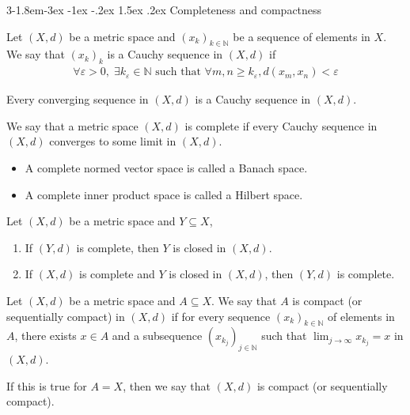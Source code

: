 \documentclass{tufte-handout}
\makeatletter
\renewcommand{\subsection}{\@startsection{subsection}%
    {3}{-1.8em}{-3ex \@plus -1ex \@minus -.2ex}%
    {1.5ex \@plus .2ex}
    {\hspace*{-5.5em}\fcolorbox{ltblue}{ltblue}{\parbox[c][1.0ex][b]{4em}{\phantom{space}}}
    \normalfont\large\itshape\color{ltblue}}}
\makeatother
\begin{document}
\subsection{Completeness and compactness}

\begin{Definition}
    Let \((X, d)\) be a metric space and \( (x_k)_{k\in \mathbb{N}} \) be a sequence of elements in \( X \).
    We say that \((x_k)_k\) is a Cauchy sequence in \( (X, d) \) if
    \begin{align}
        \forall \varepsilon > 0, \; \exists k_\varepsilon \in \mathbb{N} \text{ such that } 
        \forall m, n \geq k_\varepsilon, d(x_m, x_n) < \varepsilon
    \end{align}
\end{Definition}

\begin{Proposition}
    Every converging sequence in \((X, d)\) is a Cauchy sequence in \( (X, d) \).
\end{Proposition}

\begin{Definition}
    We say that a metric space \((X, d)\) is complete if every 
    Cauchy sequence in \( (X, d) \) converges to some limit in \( (X, d) \).
    \begin{itemize}
        \item A complete normed vector space is called a Banach space.
        \item A complete inner product space is called a Hilbert space.
    \end{itemize}
\end{Definition}

\begin{Proposition}
    Let \((X,d)\) be a metric space and \(Y\subseteq X\),
    \begin{enumerate}
        \item If \((Y,d)\) is complete, then \(Y\) is closed in \((X,d)\).
        \item If \((X,d)\) is complete and \( Y \) is closed in \((X,d)\), then \((Y,d)\) is complete.
    \end{enumerate}
\end{Proposition}


\begin{Definition}[Compactness]
    Let \((X, d)\) be a metric space and \( A \subseteq X \). 
    We say that \( A \) is compact (or sequentially compact) in \( (X, d) \) if for every
    sequence \( (x_k)_{k\in \mathbb{N}} \) of elements in \( A \),
    there exists \( x \in A \) and a subsequence \( (x_{k_j})_{j\in \mathbb{N}} \) such that 
    \(\lim_{j\to \infty} x_{k_j} = x\) in \( (X, d) \).

    If this is true for \(A = X\), then we say that \((X, d)\) is compact (or sequentially compact).
\end{Definition}
\end{document}
